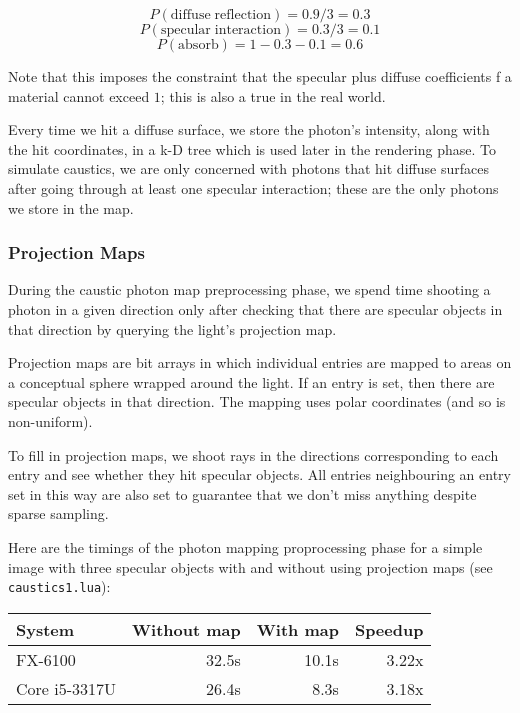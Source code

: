 \documentclass{article}
\newcommand{\mrm}[1]{\mathrm{#1}}
\begin{document}
$$P(\mrm{diffuse\; reflection}) = 0.9 / 3 = 0.3$$
$$P(\mrm{specular\; interaction}) = 0.3 / 3 = 0.1$$
$$P(\mrm{absorb}) = 1 - 0.3 - 0.1 = 0.6$$

Note that this imposes the constraint that the specular plus diffuse coefficients
f a material cannot exceed $1$; this is also a true in the real world.

Every time we hit a diffuse surface, we store the photon's intensity, along with
the hit coordinates, in a k-D tree which is used later in the rendering phase.
To simulate caustics, we are only concerned with photons that hit diffuse
surfaces after going through at least one specular interaction; these are the
only photons we store in the map.


\subsubsection{Projection Maps}

During the caustic photon map preprocessing phase, we spend time shooting a
photon in a given direction only after checking that there are specular objects
in that direction by querying the light's projection map.

Projection maps are bit arrays in which individual entries are mapped to areas on
a conceptual sphere wrapped around the light. If an entry is set, then there are
specular objects in that direction. The mapping uses polar coordinates (and so
is non-uniform).

To fill in projection maps, we shoot rays in the directions corresponding
to each entry and see whether they hit specular objects. All entries
neighbouring an entry set in this way are also set to guarantee that we don't
miss anything despite sparse sampling.

Here are the timings of the photon mapping proprocessing phase for a simple image with three specular objects
with and without using projection maps (see {\tt caustics1.lua}):

\begin{tabular}{|l|r|r|r|} \hline
 System & Without map & With map & Speedup \\\hline
 FX-6100 & 32.5s & 10.1s & 3.22x \\\hline
 Core i5-3317U & 26.4s & 8.3s & 3.18x \\\hline
\end{tabular} \\
\end{document}
